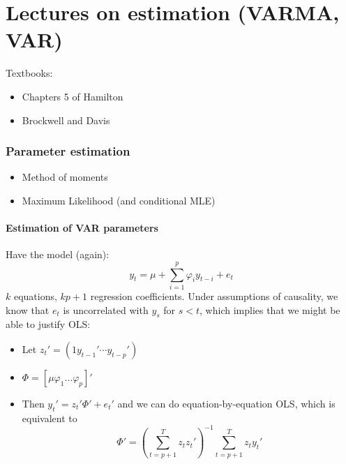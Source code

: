 % 

\part*{Lectures on estimation (VARMA, VAR)}

Textbooks:
\begin{itemize}
\item Chapters 5 of Hamilton
\item Brockwell and Davis
\end{itemize}

\section{Parameter estimation}

\begin{itemize}
\item Method of moments
\item Maximum Likelihood (and conditional MLE)
\end{itemize}

\subsection{Estimation of VAR parameters}

Have the model (again):
\[y_t = μ + ∑_{i=1}^p φ_i y_{t-i} + e_t\] $k$ equations, $k p + 1$
regression coefficients. Under assumptions of causality, we know that
$e_t$ is uncorrelated with $y_s$ for $s < t$, which implies that we
might be able to justify OLS:
\begin{itemize}
\item Let $z_t' = (1 y_{t-1}' ⋯ y_{t-p}')$
\item $Φ = [ μ φ_1 … φ_p ]'$
\item Then $y_t' = z_t'Φ' + e_t'$ and we can do equation-by-equation
  OLS, which is equivalent to
  \[\hat Φ' = (∑_{t=p+1}^T z_t z_t')^{-1} ∑_{t=p+1}^T z_t y_t'\]
\end{itemize}

